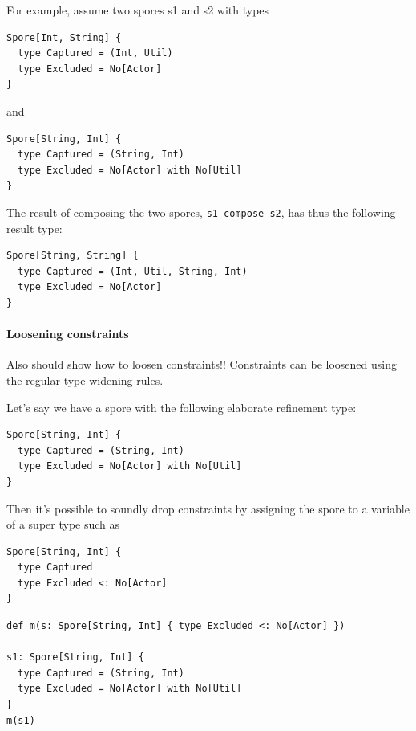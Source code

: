 \documentclass{llncs}
\begin{document}
For example, assume two spores s1 and s2 with types
\begin{lstlisting}
Spore[Int, String] {
  type Captured = (Int, Util)
  type Excluded = No[Actor]
}
\end{lstlisting}
\noindent
and
\begin{lstlisting}
Spore[String, Int] {
  type Captured = (String, Int)
  type Excluded = No[Actor] with No[Util]
}
\end{lstlisting}
\noindent
The result of composing the two spores, \verb|s1 compose s2|, has thus the following result type:

\begin{lstlisting}
Spore[String, String] {
  type Captured = (Int, Util, String, Int)
  type Excluded = No[Actor]
}
\end{lstlisting}

\paragraph{Loosening constraints}
Also should show how to loosen constraints!!
Constraints can be loosened using the regular type widening rules.

Let's say we have a spore with the following elaborate refinement type:
\begin{lstlisting}
Spore[String, Int] {
  type Captured = (String, Int)
  type Excluded = No[Actor] with No[Util]
}
\end{lstlisting}

Then it's possible to soundly drop constraints by assigning the spore to a variable of a super type such as

\begin{lstlisting}
Spore[String, Int] {
  type Captured
  type Excluded <: No[Actor]
}
\end{lstlisting}

\begin{lstlisting}
def m(s: Spore[String, Int] { type Excluded <: No[Actor] })

s1: Spore[String, Int] {
  type Captured = (String, Int)
  type Excluded = No[Actor] with No[Util]
}
m(s1)
\end{lstlisting}



\end{document}
